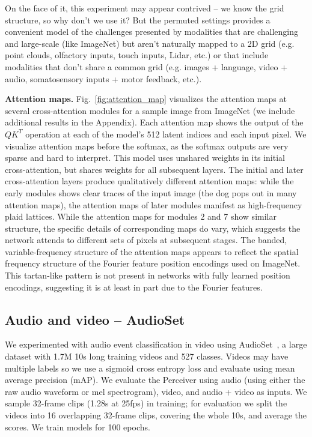 On the face of it, this experiment may appear contrived -- we know the grid structure, so why don't we use it? But the permuted settings provides a convenient model of the challenges presented by modalities that are challenging and large-scale (like ImageNet) but aren't naturally mapped to a 2D grid (e.g. point clouds, olfactory inputs, touch inputs, Lidar, etc.) or that include modalities that don't share a common grid (e.g. images + language, video + audio, somatosensory inputs + motor feedback, etc.).

 \textbf{Attention maps.} Fig.~\ref{fig:attention_map} visualizes the attention maps at several cross-attention modules for a sample image from ImageNet (we include additional results in the Appendix). Each attention map shows the output of the $QK^T$ operation at each of the model's 512 latent indices and each input pixel. We visualize attention maps before the softmax, as the softmax outputs are very sparse and hard to interpret. This model uses unshared weights in its initial cross-attention, but shares weights for all subsequent layers. The initial and later cross-attention layers produce qualitatively different attention maps: while the early modules shows clear traces of the input image (the dog pops out in many attention maps), the attention maps of later modules manifest as high-frequency plaid lattices. While the attention maps for modules 2 and 7 show similar structure, the specific details of corresponding maps do vary, which suggests the network attends to different sets of pixels at subsequent stages. The banded, variable-frequency structure of the attention maps appears to reflect the spatial frequency structure of the Fourier feature position encodings used on ImageNet. This tartan-like pattern is not present in networks with fully learned position encodings, suggesting it is at least in part due to the Fourier features. 

\subsection{Audio and video -- AudioSet}
\label{sec:audioset}

We experimented with audio event classification in video using AudioSet~\cite{gemmeke2017audio}, a large dataset with 1.7M 10s long training videos and 527 classes. Videos may have multiple labels so we use a sigmoid cross entropy loss and evaluate using mean average precision (mAP). We evaluate the Perceiver using audio (using either the raw audio waveform or mel spectrogram), video, and audio + video as inputs. We sample 32-frame clips (1.28s at 25fps) in training; for evaluation we split the videos into 16 overlapping 32-frame clips, covering the whole 10s, and average the scores. We train models for 100 epochs.

